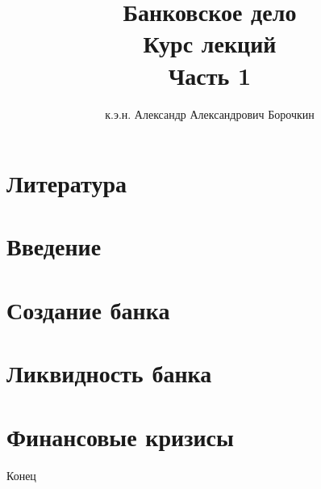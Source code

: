 \documentclass[12pt]{beamer}
\title[Банковское дело]{Банковское дело\\Курс лекций\\Часть 1}
\author{к.э.н. Александр Александрович Борочкин}
\institute{Нижегородский государственный университет}
\date{\the\year}
\begin{document}
\begin{frame}
\titlepage
\end{frame}


\section*{Литература}


\section{Введение}


\section{Создание банка}


\section{Ликвидность банка}


\section{Финансовые кризисы}


\begin{frame}
\begin{center}
\huge{Конец}
\end{center}
\end{frame}
\end{document}
